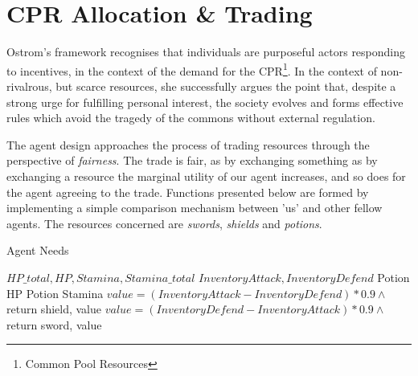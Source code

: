 \section{CPR Allocation \& Trading}

Ostrom's framework recognises that individuals are purposeful actors responding to incentives, in the context of the demand for the CPR\footnote{Common Pool Resources}. In the context of non-rivalrous, but scarce resources, she successfully argues the point that, despite a strong urge for fulfilling personal interest, the society evolves and forms effective rules which avoid the tragedy of the commons without external regulation.

The agent design approaches the process of trading resources through the perspective of \textit{fairness}. The trade is fair, as by exchanging something as by exchanging a resource the marginal utility of our agent increases, and so does for the agent agreeing to the trade. Functions presented below are formed by implementing a simple comparison mechanism between 'us' and other fellow agents. The resources concerned are \textit{swords}, \textit{shields} and \textit{potions}.



\begin{algorithm}
\caption{Agent Needs}\label{alg:27}
\begin{algorithmic} 
\scriptsize
\Require $HP\_total, HP, Stamina, Stamina\_total$
\Require $InventoryAttack,InventoryDefend $
\State Potion HP
\EndIf
{}
\State Potion Stamina
\EndIf
{}
\State $value = (InventoryAttack - InventoryDefend)*0.9 \land$ return shield, value
\Else
\State $value = (InventoryDefend - InventoryAttack)*0.9 \land$ return sword, value
\EndIf
\end{algorithmic}
\end{algorithm}


